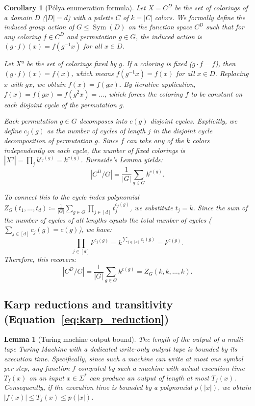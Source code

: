 \documentclass[11pt, letterpaper]{article}
\newtheorem{lemma}{Lemma}[section]
\newtheorem{corollary}{Corollary}[section]
\begin{document}
\begin{corollary}[Pólya enumeration formula]
Let $X = C^D$ be the set of colorings of a domain $D$ ($|D| = d$) with a palette $C$ of $k = |C|$ colors. We formally define the induced group action of $G \le \operatorname{Sym}(D)$ on the function space $C^D$ such that for any coloring $f \in C^D$ and permutation $g \in G$, the induced action is $(g \cdot f)(x) = f(g^{-1}x)$ for all $x \in D$.

Let $X^g$ be the set of colorings fixed by $g$. If a coloring is fixed ($g \cdot f = f$), then $(g \cdot f)(x) = f(x)$, which means $f(g^{-1}x) = f(x)$ for all $x \in D$. Replacing $x$ with $gx$, we obtain $f(x) = f(gx)$. By iterative application, $f(x) = f(gx) = f(g^2x) = \dots$, which forces the coloring $f$ to be constant on each disjoint cycle of the permutation $g$. 

Each permutation $g \in G$ decomposes into $c(g)$ disjoint cycles. Explicitly, we define $c_j(g)$ as the number of cycles of length $j$ in the disjoint cycle decomposition of permutation $g$. Since $f$ can take any of the $k$ colors independently on each cycle, the number of fixed colorings is $|X^g| = \prod_{j} k^{c_j(g)} = k^{c(g)}$. Burnside's Lemma yields:
\begin{equation}
    |C^D / G| = \frac{1}{|G|} \sum_{g \in G} k^{c(g)}.
\end{equation}

To connect this to the cycle index polynomial $Z_G(t_1, \dots, t_d) \coloneqq \frac{1}{|G|} \sum_{g \in G} \prod_{j \in [d]} t_j^{c_j(g)}$, we substitute $t_j = k$. Since the sum of the number of cycles of all lengths equals the total number of cycles ($\sum_{j \in [d]} c_j(g) = c(g)$), we have:
\begin{equation}
    \prod_{j \in [d]} k^{c_j(g)} = k^{\sum_{j \in [d]} c_j(g)} = k^{c(g)}.
\end{equation}
Therefore, this recovers:
\begin{equation}
    |C^D / G| = \frac{1}{|G|} \sum_{g \in G} k^{c(g)} = Z_G(k, k, \dots, k).
\end{equation}
\end{corollary}

\subsection{Karp reductions and transitivity (\texorpdfstring{Equation~\ref{eq:karp_reduction}}{Eq. 11})}
\begin{lemma}[Turing machine output bound]
\label{lem:tm_output}
The length of the output of a multi-tape Turing Machine with a dedicated write-only output tape is bounded by its execution time. Specifically, since such a machine can write at most one symbol per step, any function $f$ computed by such a machine with actual execution time $T_f(x)$ on an input $x \in \Sigma^*$ can produce an output of length at most $T_f(x)$. Consequently, if the execution time is bounded by a polynomial $p(|x|)$, we obtain $|f(x)| \le T_f(x) \le p(|x|)$.
\end{lemma}
\end{document}
